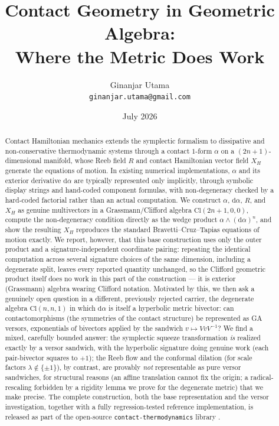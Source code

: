 \documentclass[11pt]{article}
\title{\Large Contact Geometry in Geometric Algebra:\\ Where the Metric Does Work}
\author{Ginanjar Utama\\ \small \texttt{ginanjar.utama@gmail.com}}
\date{July 2026}
\newcommand{\Cl}{\mathrm{Cl}}
\newcommand{\dif}{\mathrm{d}}
\begin{document}
\maketitle

\begin{abstract}
Contact Hamiltonian mechanics \cite{bravetti2017contact} extends the symplectic formalism to dissipative and non-conservative thermodynamic systems through a contact $1$-form $\alpha$ on a $(2n+1)$-dimensional manifold, whose Reeb field $R$ and contact Hamiltonian vector field $X_H$ generate the equations of motion. In existing numerical implementations, $\alpha$ and its exterior derivative $\dif\alpha$ are typically represented only implicitly, through symbolic display strings and hand-coded component formulas, with non-degeneracy checked by a hard-coded factorial rather than an actual computation. We construct $\alpha$, $\dif\alpha$, $R$, and $X_H$ as genuine multivectors in a Grassmann/Clifford algebra $\Cl(2n+1,0,0)$, compute the non-degeneracy condition directly as the wedge product $\alpha\wedge(\dif\alpha)^n$, and show the resulting $X_H$ reproduces the standard Bravetti--Cruz--Tapias equations of motion exactly. We report, however, that this base construction uses only the outer product and a signature-independent coordinate pairing: repeating the identical computation across several signature choices of the same dimension, including a degenerate split, leaves every reported quantity unchanged, so the Clifford geometric product itself does no work in this part of the construction — it is exterior (Grassmann) algebra wearing Clifford notation. Motivated by this, we then ask a genuinely open question in a different, previously rejected carrier, the degenerate algebra $\Cl(n,n,1)$ in which $\dif\alpha$ is itself a hyperbolic metric bivector: can contactomorphisms (the symmetries of the contact structure) be represented as GA versors, exponentials of bivectors applied by the sandwich $v\mapsto VvV^{-1}$? We find a mixed, carefully bounded answer: the symplectic squeeze transformation \emph{is} realized exactly by a versor sandwich, with the hyperbolic signature doing genuine work (each pair-bivector squares to $+1$); the Reeb flow and the conformal dilation (for scale factors $\lambda\notin\{\pm1\}$), by contrast, are provably \emph{not} representable as pure versor sandwiches, for structural reasons (an affine translation cannot fix the origin; a radical-rescaling forbidden by a rigidity lemma we prove for the degenerate metric) that we make precise. The complete construction, both the base representation and the versor investigation, together with a fully regression-tested reference implementation, is released as part of the open-source \texttt{contact-thermodynamics} library \cite{contactthermolib}.
\end{abstract}
\end{document}
